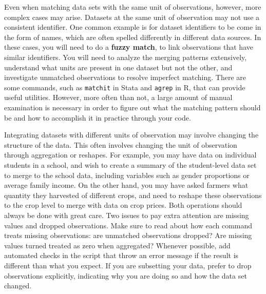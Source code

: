Even when matching data sets with the same unit of observations, however,
more complex cases may arise.
Datasets at the same unit of observation may not use a consistent identifier.
One common example is for dataset identifiers to be come in the form of names, 
which are often spelled differently in different data sources. 
In these cases, you will need to do a \textbf{fuzzy match}, 
to link observations that have similar identifiers. 
You will need to analyze the merging patterns extensively,
understand what units are present in one dataset but not the other,
and investigate unmatched observations to resolve imperfect matching.
There are some commands, such as \texttt{matchit} in Stata
and \texttt{agrep} in R,
that can provide useful utilities.
However, more often than not, a large amount of manual examination is necessary
in order to figure out what the matching pattern should be
and how to accomplish it in practice through your code.

Integrating datasets with different units of observation may involve changing the structure of the data.
This often involves changing the unit of observation through aggregation or reshapes.
For example, you may have data on individual students in a school,
and wish to create a summary of the student-level data set to merge to the school data, 
including variables such as gender proportions or average family income.
On the other hand, you may have asked farmers what quantity they harvested of different crops,
and need to reshape these observations to the crop level to merge with data on crop prices.
Both operations should always be done with great care. 
Two issues to pay extra attention are missing values and dropped observations.
Make sure to read about how each command treats missing observations:
are unmatched observations dropped? Are missing values turned treated as zero when aggregated?
Whenever possible, add automated checks in the script that throw an error message 
if the result is different than what you expect.
If you are subsetting your data, prefer to drop observations explicitly,
indicating why you are doing so and how the data set changed.

